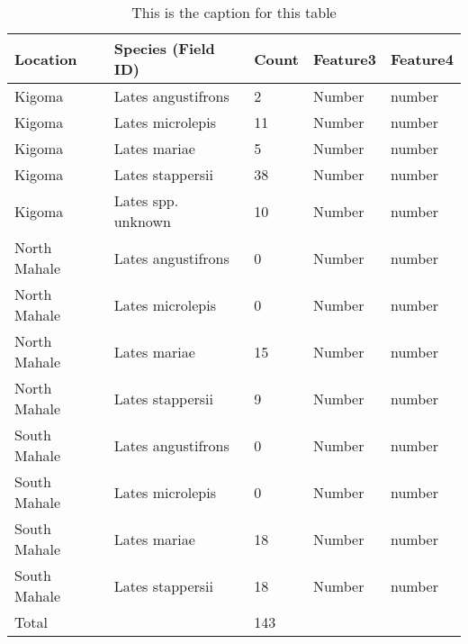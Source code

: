 
\begin{table}[ht]
\centering
\caption{This is the caption for this table}
\label{table:species-location}
\begin{tabular}{@{}lllll@{}}
\toprule
Location  & Species (Field ID) & Count & Feature3 & Feature4 \\ \midrule
Kigoma & Lates angustifrons  & 2   & Number   & number   \\
Kigoma & Lates microlepis  & 11   & Number   & number   \\
Kigoma & Lates mariae  & 5 & Number   & number   \\
Kigoma & Lates stappersii  & 38 & Number   & number   \\
Kigoma & Lates spp. unknown & 10 & Number & number \\
North Mahale & Lates angustifrons  & 0   & Number   & number   \\
North Mahale & Lates microlepis  & 0   & Number   & number   \\
North Mahale & Lates mariae  & 15   & Number   & number   \\
North Mahale & Lates stappersii  & 9   & Number   & number   \\
South Mahale & Lates angustifrons  & 0   & Number   & number   \\
South Mahale & Lates microlepis  & 0   & Number   & number   \\
South Mahale & Lates mariae  & 18  & Number   & number   \\
South Mahale & Lates stappersii  & 18   & Number   & number   \\ \bottomrule
Total & & 143 & &
\end{tabular}
\end{table}